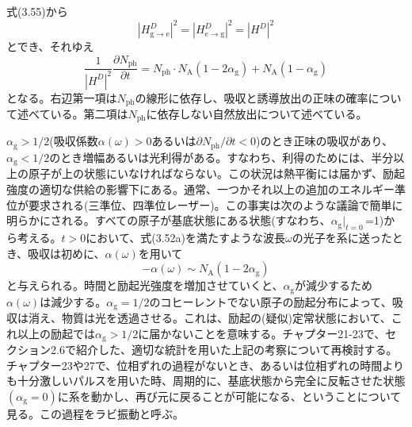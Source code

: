 \documentclass[11pt,a4j,uplatex]{jsarticle}
\begin{document}
式(3.55)から
\begin{equation}
  \left|H_{\mathrm{g\to e}}^D\right|^2=\left|H_{\mathrm{e\to g}}^D\right|^2=\left|H^D\right|^2\tag{3.62}
\end{equation}
とでき、それゆえ
\begin{equation}
  \frac{1}{\left|H^D\right|^2}\frac{\partial N_{\mathrm{ph}}}{\partial t}=N_{\mathrm{ph}}\cdot N_{\mathrm{A}}(1-2\alpha_{\mathrm{g}})+N_{\mathrm{A}}(1-\alpha_{\mathrm{g}})\tag{3.63}
\end{equation}
となる。右辺第一項は$N_{\mathrm{ph}}$の線形に依存し、吸収と誘導放出の正味の確率について述べている。第二項は$N_{\mathrm{ph}}$に依存しない自然放出について述べている。

$\alpha_{\mathrm{g}}>1/2$(吸収係数$\alpha(\omega)>0$あるいは$\partial N_{\mathrm{ph}}/\partial t<0$)のとき正味の吸収があり、$\alpha_{\mathrm{g}}<1/2$のとき増幅あるいは光利得がある。すなわち、利得のためには、半分以上の原子が上の状態にいなければならない。この状況は熱平衡には届かず、励起強度の適切な供給の影響下にある。通常、一つかそれ以上の追加のエネルギー準位が要求される(三準位、四準位レーザー)。この事実は次のような議論で簡単に明らかにされる。すべての原子が基底状態にある状態(すなわち、$\alpha_{\mathrm{g}}|_{t=0}$\,=1)から考える。$t>0$において、式(3.52a)を満たすような波長$\omega$の光子を系に送ったとき、吸収は初めに、$\alpha(\omega)$を用いて
\begin{equation}
  -\alpha(\omega)\sim N_{\mathrm{A}}(1-2\alpha_{\mathrm{g}})\tag{3.64}
\end{equation}
と与えられる。時間と励起光強度を増加させていくと、$\alpha_{\mathrm{g}}$が減少するため$\alpha(\omega)$は減少する。$\alpha_{\mathrm{g}}=1/2$のコヒーレントでない原子の励起分布によって、吸収は消え、物質は光を透過させる。これは、励起の(疑似)定常状態において、これ以上の励起では$\alpha_{\mathrm{g}}>1/2$に届かないことを意味する。チャプター21-23で、セクション2.6で紹介した、適切な統計を用いた上記の考察について再検討する。チャプター23や27で、位相ずれの過程がないとき、あるいは位相ずれの時間よりも十分激しいパルスを用いた時、周期的に、基底状態から完全に反転させた状態$(\alpha_{\mathrm{g}}=0)$に系を動かし、再び元に戻ることが可能になる、ということについて見る。この過程をラビ振動と呼ぶ。
\end{document}
